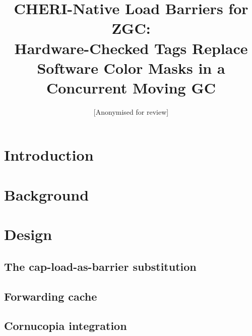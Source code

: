 \documentclass[acmsmall,nonacm]{acmart}
\title{{CHERI}-Native Load Barriers for {ZGC}: \\
       Hardware-Checked Tags Replace Software Color Masks
       in a Concurrent Moving GC}
\author{[Anonymised for review]}
\affiliation{\institution{[Anonymised]}\country{}}
\begin{document}
\maketitle

\section{Introduction}
\label{sec:intro}


\section{Background}
\label{sec:bg}


\section{Design}
\label{sec:design}

\subsection{The cap-load-as-barrier substitution}
\label{sec:design:swap}


\subsection{Forwarding cache}
\label{sec:design:cache}


\subsection{Cornucopia integration}
\label{sec:design:cornucopia}
\end{document}
